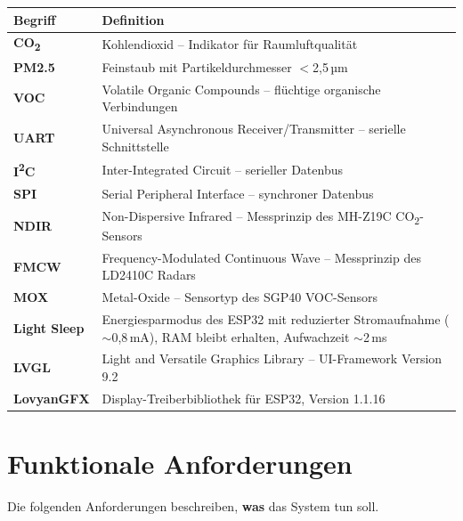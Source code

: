 \documentclass[a4paper,11pt]{article}
\begin{document}
\begin{longtable}{p{3cm} p{10cm}}
\toprule
\rowcolor{tableheader}
\textbf{Begriff} & \textbf{Definition} \\
\midrule
\endhead
\textbf{CO\textsubscript{2}} & Kohlendioxid -- Indikator für Raumluftqualität \\
\textbf{PM2.5} & Feinstaub mit Partikeldurchmesser $<$2,5\,µm \\
\textbf{VOC} & Volatile Organic Compounds -- flüchtige organische Verbindungen \\
\textbf{UART} & Universal Asynchronous Receiver/Transmitter -- serielle Schnittstelle \\
\textbf{I\textsuperscript{2}C} & Inter-Integrated Circuit -- serieller Datenbus \\
\textbf{SPI} & Serial Peripheral Interface -- synchroner Datenbus \\
\textbf{NDIR} & Non-Dispersive Infrared -- Messprinzip des MH-Z19C CO\textsubscript{2}-Sensors \\
\textbf{FMCW} & Frequency-Modulated Continuous Wave -- Messprinzip des LD2410C Radars \\
\textbf{MOX} & Metal-Oxide -- Sensortyp des SGP40 VOC-Sensors \\
\textbf{Light Sleep} & Energiesparmodus des ESP32 mit reduzierter Stromaufnahme (${\sim}$0,8\,mA), RAM bleibt erhalten, Aufwachzeit ${\sim}$2\,ms \\
\textbf{LVGL} & Light and Versatile Graphics Library -- UI-Framework Version 9.2 \\
\textbf{LovyanGFX} & Display-Treiberbibliothek für ESP32, Version 1.1.16 \\
\bottomrule
\end{longtable}

\section{Funktionale Anforderungen}

Die folgenden Anforderungen beschreiben, \textbf{was} das System tun soll.
\end{document}
